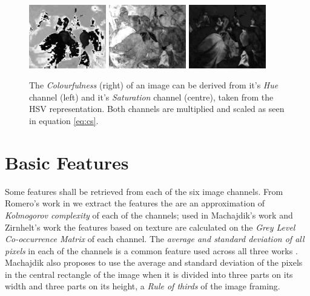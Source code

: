 \documentclass[11pt,a4paper,twoside,openright]{report}
\begin{document}
\begin{figure}[tbp]
\centering
\includegraphics[width=0.30\textwidth]{H_caravaggio_1962_139_1}
\includegraphics[width=0.30\textwidth]{SHSV_caravaggio_1962_139_1}
\includegraphics[width=0.30\textwidth]{CS_caravaggio_1962_139_1}
\caption[Colourfulness]{The \emph{Colourfulness} (right) of an image can be
derived from it's \emph{Hue} channel (left) and it's \emph{Saturation} channel
(centre), taken from the HSV representation.  Both channels are multiplied and
scaled as seen in equation \ref{eq:cs}.}
\label{fig:cs}
\end{figure}

\section{Basic Features}

Some features shall be retrieved from each of the six image channels.  From
Romero's work in \cite{rmc12ajs} we extract the features the are an
approximation of \emph{Kolmogorov complexity} of each of the channels; used in
Machajdik's work \cite{mach10clas} and Zirnhelt's work \cite{zirnhelt07art} the
features based on texture are calculated on the \emph{Grey Level Co-occurrence
Matrix} of each channel.  The \emph{average and standard deviation of all
pixels} in each of the channels is a common feature used across all three works
\cite{jma12clas,zirnhelt07art,mach10clas}.  Machajdik \cite{mach10clas} also
proposes to use the average and standard deviation of the pixels in the central
rectangle of the image when it is divided into three parts on its width and
three parts on its height, a \emph{Rule of thirds} of the image framing.
\end{document}
